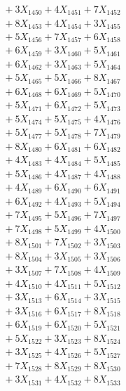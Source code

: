 \documentclass[a4paper,10pt]{article}
\begin{document}
{\begin{align}
&\;  + 3 X_{1450} + 4 X_{1451} + 7 X_{1452} \\[0.3ex]
&\;  + 8 X_{1453} + 4 X_{1454} + 3 X_{1455} \\[0.3ex]
&\;  + 5 X_{1456} + 7 X_{1457} + 6 X_{1458} \\[0.3ex]
&\;  + 6 X_{1459} + 3 X_{1460} + 5 X_{1461} \\[0.3ex]
&\;  + 6 X_{1462} + 3 X_{1463} + 5 X_{1464} \\[0.3ex]
&\;  + 5 X_{1465} + 5 X_{1466} + 8 X_{1467} \\[0.3ex]
&\;  + 6 X_{1468} + 6 X_{1469} + 5 X_{1470} \\[0.3ex]
&\;  + 5 X_{1471} + 6 X_{1472} + 5 X_{1473} \\[0.3ex]
&\;  + 5 X_{1474} + 5 X_{1475} + 4 X_{1476} \\[0.3ex]
&\;  + 5 X_{1477} + 5 X_{1478} + 7 X_{1479} \\[0.5ex]\allowbreak
&\;  + 8 X_{1480} + 6 X_{1481} + 6 X_{1482} \\[0.3ex]
&\;  + 4 X_{1483} + 4 X_{1484} + 5 X_{1485} \\[0.3ex]
&\;  + 5 X_{1486} + 4 X_{1487} + 4 X_{1488} \\[0.3ex]
&\;  + 4 X_{1489} + 6 X_{1490} + 6 X_{1491} \\[0.3ex]
&\;  + 6 X_{1492} + 4 X_{1493} + 5 X_{1494} \\[0.3ex]
&\;  + 7 X_{1495} + 5 X_{1496} + 7 X_{1497} \\[0.3ex]
&\;  + 7 X_{1498} + 5 X_{1499} + 4 X_{1500} \\[0.3ex]
&\;  + 8 X_{1501} + 7 X_{1502} + 3 X_{1503} \\[0.3ex]
&\;  + 8 X_{1504} + 3 X_{1505} + 3 X_{1506} \\[0.3ex]
&\;  + 3 X_{1507} + 7 X_{1508} + 4 X_{1509} \\[0.5ex]\allowbreak
&\;  + 4 X_{1510} + 4 X_{1511} + 5 X_{1512} \\[0.3ex]
&\;  + 3 X_{1513} + 6 X_{1514} + 3 X_{1515} \\[0.3ex]
&\;  + 3 X_{1516} + 6 X_{1517} + 8 X_{1518} \\[0.3ex]
&\;  + 6 X_{1519} + 6 X_{1520} + 5 X_{1521} \\[0.3ex]
&\;  + 5 X_{1522} + 3 X_{1523} + 8 X_{1524} \\[0.3ex]
&\;  + 3 X_{1525} + 4 X_{1526} + 5 X_{1527} \\[0.3ex]
&\;  + 7 X_{1528} + 8 X_{1529} + 8 X_{1530} \\[0.3ex]
&\;  + 3 X_{1531} + 4 X_{1532} + 8 X_{1533} \\[0.3ex]

\end{align}}
\end{document}
